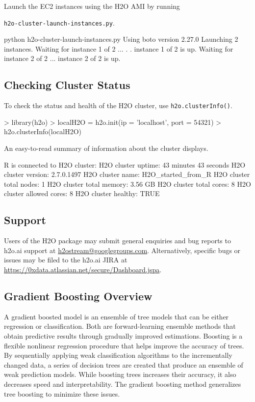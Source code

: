 \documentclass{article}[11pt]
\begin{document}
Launch the EC2 instances using the H2O AMI by running {\texttt{h2o-cluster-launch-instances.py}.

\begin{spverbatim}
python h2o-cluster-launch-instances.py
Using boto version 2.27.0
Launching 2 instances.
Waiting for instance 1 of 2 ...
  .
  .
  instance 1 of 2 is up.
Waiting for instance 2 of 2 ...
  instance 2 of 2 is up.

\end{spverbatim}

\subsection{Checking Cluster Status}


To check the status and health of the H2O cluster, use {\texttt{h2o.clusterInfo()}}.
\begin{spverbatim}
> library(h2o)
> localH2O = h2o.init(ip = 'localhost', port = 54321)
> h2o.clusterInfo(localH2O)
\end{spverbatim}

An easy-to-read summary of information about the cluster displays. 
\begin{spverbatim}
R is connected to H2O cluster:
  H2O cluster uptime:         43 minutes 43 seconds
  H2O cluster version:        2.7.0.1497
  H2O cluster name:           H2O_started_from_R
  H2O cluster total nodes:    1
  H2O cluster total memory:   3.56 GB
  H2O cluster total cores:    8
  H2O cluster allowed cores:  8
  H2O cluster healthy:        TRUE
\end{spverbatim}

\noindent

\subsection{Support} 
Users of the H2O package may submit general enquiries and bug reports to h2o.ai support at {\url{h2ostream@googlegroups.com}}. Alternatively, specific bugs or issues may be filed to the h2o.ai JIRA at {\url{https://0xdata.atlassian.net/secure/Dashboard.jspa}}.

\subsection{Gradient Boosting Overview} 

A gradient boosted model is an ensemble of tree models that can be either regression or classification. Both are forward-learning ensemble methods that obtain predictive results through gradually improved estimations. Boosting is a flexible nonlinear regression procedure that helps improve the accuracy of trees. By sequentially applying weak classification algorithms to the incrementally changed data, a series of decision trees are created that produce an ensemble of weak prediction models. While boosting trees increases their accuracy, it also decreases speed and interpretability. The gradient boosting method generalizes tree boosting to minimize these issues. 

}
\end{document}
